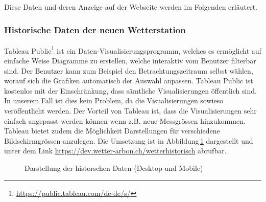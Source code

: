 \noindent
Diese Daten und deren Anzeige auf der Webseite werden im Folgenden erläutert.



\subsubsection{Historische Daten der neuen Wetterstation}
\label{kap:Tableau}
Tableau Public\footnote{ \url{https://public.tableau.com/de-de/s/}} ist ein Daten-Visualisierungsprogramm, welches es ermöglicht auf einfache Weise Diagramme zu erstellen, welche interaktiv vom Benutzer filterbar sind. Der Benutzer kann zum Beispiel den Betrachtungszeitraum selbst wählen, worauf sich die Grafiken automatisch der Auswahl anpassen. Tableau Public ist kostenlos mit der Einschränkung, dass sämtliche Visualisierungen öffentlich sind. In unserem Fall ist dies kein Problem, da die Visualisierungen sowieso veröffentlicht werden. Der Vorteil von Tableau ist, dass die Visualisierungen sehr einfach angepasst werden können wenn z.B. neue Messgrössen hinzukommen. Tableau bietet zudem die Möglichkeit Darstellungen für verschiedene Bildschirmgrössen anzulegen. Die Umsetzung ist in Abbildung\,\ref{img:tableau} dargestellt und unter dem Link \url{https://dev.wetter-arbon.ch/wetterhistorisch} abrufbar.



\begin{figure}[h!]
	\centering
	\caption{Darstellung der historschen Daten (Desktop und Mobile)}
	\label{img:tableau}
\end{figure}


